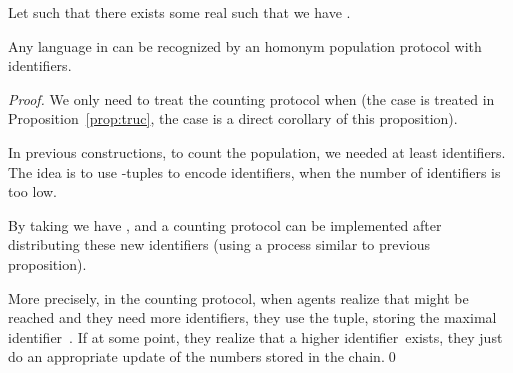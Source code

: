 \documentclass[UKenglish]{llncs}
\newcommand\id{identifier}
\begin{document}
\begin{proposition}
Let  such that there exists some real  such that we have .

Any language in  can be
recognized by an homonym population protocol with  identifiers.
\end{proposition}
\begin{proof} 
We only need to treat the counting protocol when  (the case  is treated in Proposition~\ref{prop:truc},
the case  is a direct corollary of this proposition).

In previous constructions, to count the population, we needed at least
 identifiers. The idea is to use -tuples to encode
identifiers, when the number of identifiers is too low. 

By taking   we have ,
and a counting protocol can be implemented after distributing these
new identifiers (using a process similar to previous proposition). 

More precisely, in the counting protocol, when agents realize that  might be reached and they need more identifiers, they use the tuple,
storing the maximal \id\ . If at some point, they realize that a higher \id\  exists,
they just do an appropriate update of the numbers stored in the chain.\hfill \qed

  \end{proof}
\end{document}
